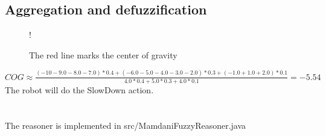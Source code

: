 \documentclass{article}
\begin{document}
\subsection*{Aggregation and defuzzification}
\begin{figure}[H]
\resizebox {\columnwidth} {!} {
}
\caption{The red line marks the center of gravity}
\end{figure}

$
COG \approx \frac{(-10-9.0-8.0-7.0)*0.4 + (-6.0-5.0-4.0-3.0-2.0)*0.3 + (-1.0+1.0+2.0)*0.1}{4.0*0.4 + 5.0*0.3 + 4.0*0.1} = -5.54
$\\

The robot will do the SlowDown action.

\section{}
The reasoner is implemented in src/MamdaniFuzzyReasoner.java
\end{document}
